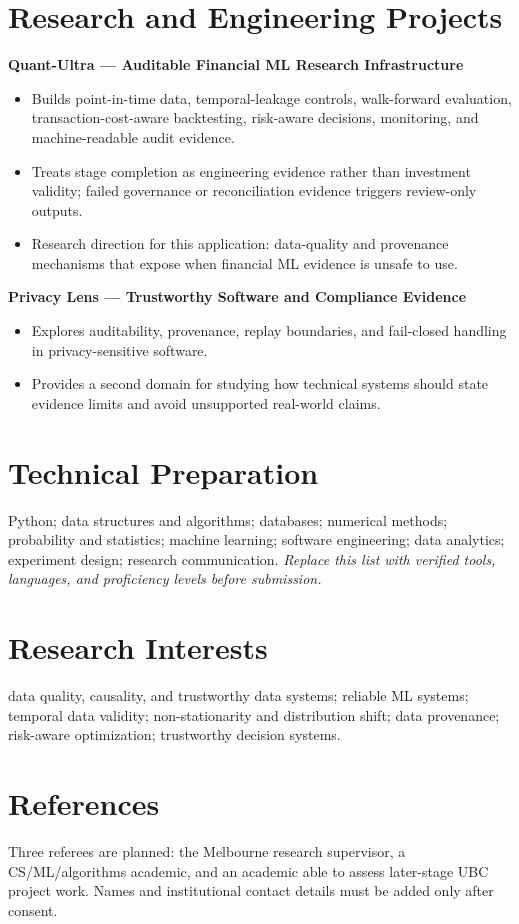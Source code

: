 \documentclass[11pt]{article}
\begin{document}
\section*{Research and Engineering Projects}
\textbf{Quant-Ultra --- Auditable Financial ML Research Infrastructure}
\begin{itemize}
\item Builds point-in-time data, temporal-leakage controls, walk-forward evaluation, transaction-cost-aware backtesting, risk-aware decisions, monitoring, and machine-readable audit evidence.
\item Treats stage completion as engineering evidence rather than investment validity; failed governance or reconciliation evidence triggers review-only outputs.
\item Research direction for this application: data-quality and provenance mechanisms that expose when financial ML evidence is unsafe to use.
\end{itemize}

\textbf{Privacy Lens --- Trustworthy Software and Compliance Evidence}
\begin{itemize}
\item Explores auditability, provenance, replay boundaries, and fail-closed handling in privacy-sensitive software.
\item Provides a second domain for studying how technical systems should state evidence limits and avoid unsupported real-world claims.
\end{itemize}

\section*{Technical Preparation}
Python; data structures and algorithms; databases; numerical methods; probability and statistics; machine learning; software engineering; data analytics; experiment design; research communication. \textit{Replace this list with verified tools, languages, and proficiency levels before submission.}

\section*{Research Interests}
data quality, causality, and trustworthy data systems; reliable ML systems; temporal data validity; non-stationarity and distribution shift; data provenance; risk-aware optimization; trustworthy decision systems.

\section*{References}
Three referees are planned: the Melbourne research supervisor, a CS/ML/algorithms academic, and an academic able to assess later-stage UBC project work. Names and institutional contact details must be added only after consent.
\end{document}
